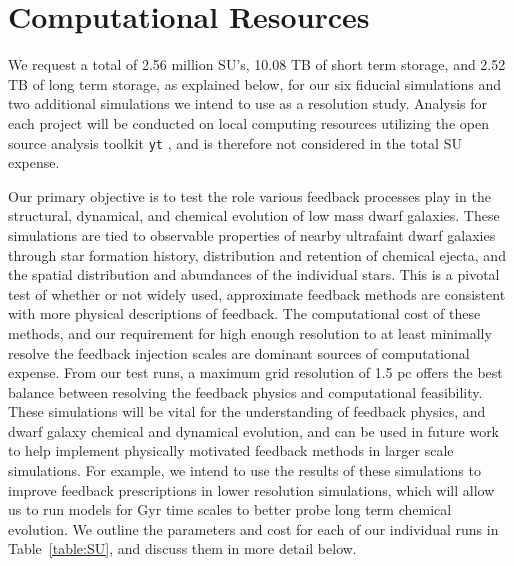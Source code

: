\documentclass[11pt]{article}
\begin{document}
\section{Computational Resources}
We request a total of 2.56 million SU's, 10.08 TB of short term storage, and 2.52 TB of long term storage, as explained below, for our six fiducial simulations and two additional simulations we intend to use as a resolution study. Analysis for each project will be conducted on local computing resources utilizing the open source analysis toolkit \texttt{yt} \citep{yt}, and is therefore not considered in the total SU expense.

Our primary objective is to test the role various feedback processes play in the structural, dynamical, and chemical evolution of low mass dwarf galaxies. These simulations are tied to observable properties of nearby ultrafaint dwarf galaxies through star formation history, distribution and retention of chemical ejecta, and the spatial distribution and abundances of the individual stars. This is a pivotal test of whether or not widely used, approximate feedback methods are consistent with more physical descriptions of feedback. The computational cost of these methods, and our requirement for high enough resolution to at least minimally resolve the feedback injection scales are dominant sources of computational expense. From our test runs, a maximum grid resolution of 1.5 pc offers the best balance between resolving the feedback physics and computational feasibility. These simulations will be vital for the understanding of feedback physics, and dwarf galaxy chemical and dynamical evolution, and can be used in future work to help implement physically motivated feedback methods in larger scale simulations. For example, we intend to use the results of these simulations to improve feedback prescriptions in lower resolution simulations, which will allow us to run models for Gyr time scales to better probe long term chemical evolution. We outline the parameters and cost for each of our individual runs in Table~\ref{table:SU}, and discuss them in more detail below.
\end{document}
